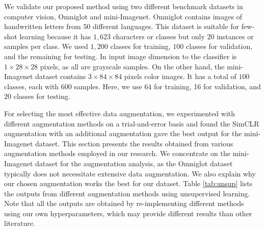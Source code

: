 We validate our proposed method using two different benchmark datasets in computer vision, Omniglot and mini-Imagenet. Omniglot contains images of handwritten letters from $50$ different languages. This dataset is suitable for few-shot learning because it has $1,623$ characters or classes but only $20$ instances or samples per class. We used $1,200$ classes for training, $100$ classes for validation, and the remaining for testing. In input image dimension to the classifier is $1\times 28\times 28$ pixels, as all are grayscale samples. On the other hand, the mini-Imagenet dataset contains $3\times 84\times 84$ pixels color images. It has a total of $100$ classes, each with $600$ samples. Here, we use $64$ for training, 16 for validation, and $20$ classes for testing.

For selecting the most effective data augmentation, we experimented with different augmentation methods on a trial-and-error basis and found the SimCLR augmentation with an additional augmentation gave the best output for the mini-Imagenet dataset. This section presents the results obtained from various augmentation methods employed in our research. We concentrate on the mini-Imagenet dataset for the augmentation analysis, as the Omniglot dataset typically does not necessitate extensive data augmentation. We also explain why our chosen augmentation works the best for our dataset. Table \ref{tab:unsup} lists the outputs from different augmentation methods using unsupervised learning. Note that all the outputs are obtained by re-implementing different methods using our own hyperparameters, which may provide different results than other literature.


